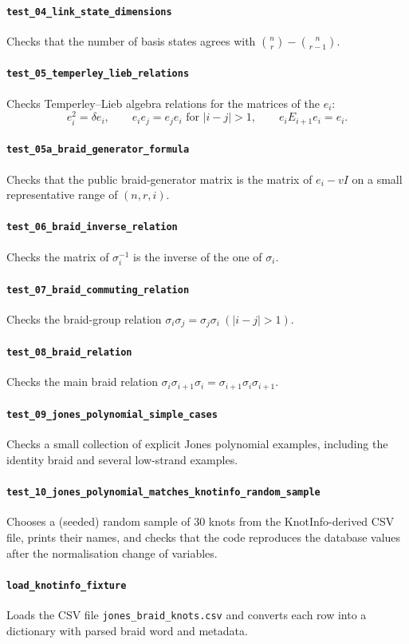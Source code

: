 ﻿\documentclass[10pt]{article}
\begin{document}
\paragraph{\texttt{test\_04\_link\_state\_dimensions}}
Checks that the number of basis states agrees with $\binom{n}{r} - \binom{n}{r-1}$.

\paragraph{\texttt{test\_05\_temperley\_lieb\_relations}}
Checks Temperley--Lieb algebra relations for the matrices of the \(e_i\):
\[
e_i^2 = \delta e_i,\qquad
e_ie_j = e_je_i \text{ for } |i-j|>1,\qquad
e_iE_{i+1}e_i = e_i.
\]

\paragraph{\texttt{test\_05a\_braid\_generator\_formula}}
Checks that the public braid-generator matrix is the matrix of \(e_i - vI\) on a
small representative range of \((n,r,i)\).

\paragraph{\texttt{test\_06\_braid\_inverse\_relation}}
Checks the matrix of \(\sigma_i^{-1}\) is the inverse of the one of \(\sigma_i\).

\paragraph{\texttt{test\_07\_braid\_commuting\_relation}}
Checks the braid-group relation $\sigma_i \sigma_j = \sigma_j \sigma_i\ (|i-j|>1)$.

\paragraph{\texttt{test\_08\_braid\_relation}}
Checks the main braid relation $\sigma_i \sigma_{i+1} \sigma_i=\sigma_{i+1} \sigma_i \sigma_{i+1}$.

\paragraph{\texttt{test\_09\_jones\_polynomial\_simple\_cases}}
Checks a small collection of explicit Jones polynomial examples, including the identity braid and several low-strand examples.

\paragraph{\texttt{test\_10\_jones\_polynomial\_matches\_knotinfo\_random\_sample}}
Chooses a (seeded) random sample of 30 knots from the KnotInfo-derived CSV file, prints their names, and checks that the code reproduces the database values after the normalisation change of variables.

\paragraph{\texttt{load\_knotinfo\_fixture}}
Loads the CSV file \texttt{jones\_braid\_knots.csv} and converts each row into a dictionary with parsed braid word and metadata.
\end{document}
